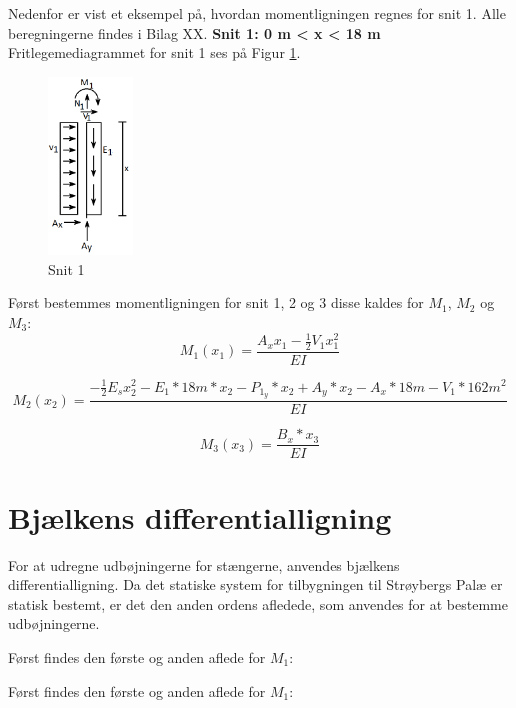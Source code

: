 Nedenfor er vist et eksempel på, hvordan momentligningen regnes for snit 1. Alle beregningerne findes i Bilag XX.
\newline
\newline
\textbf{Snit 1: 0 m < x < 18 m}
\newline
Fritlegemediagrammet for snit 1 ses på Figur \ref{fig:snitetan}.
\begin{figure}[H]
	\centering
	\includegraphics[width=0.2\textwidth]{billeder/asnitet.png}
	\caption{Snit 1}
	\label{fig:snitetan}
\end{figure}


Først bestemmes momentligningen for snit 1, 2 og 3 disse kaldes for $M_1$, $M_2$ og $M_3$:
\begin{equation}
M_1(x_1)=\frac{A_xx_1-\frac{1}{2}V_1x_1^2}{EI}
\end{equation}

\begin{equation}
M_2(x_2)=\frac{-\frac{1}{2}E_sx_2^2-E_1*18m*x_2-P_1_y*x_2+A_y*x_2-A_x*18m-V_1*162m^2}{EI}
\end{equation}

\begin{equation}
M_3(x_3)=\frac{B_x*x_3}{EI}
\end{equation}

\section{Bjælkens differentialligning}
For at udregne udbøjningerne for stængerne, anvendes bjælkens differentialligning. Da det statiske system for tilbygningen til Strøybergs Palæ er statisk bestemt, er det den anden ordens afledede, som anvendes for at bestemme udbøjningerne.
\newline

Først findes den første og anden aflede for $M_1$: 

Først findes den første og anden aflede for $M_1$: %

